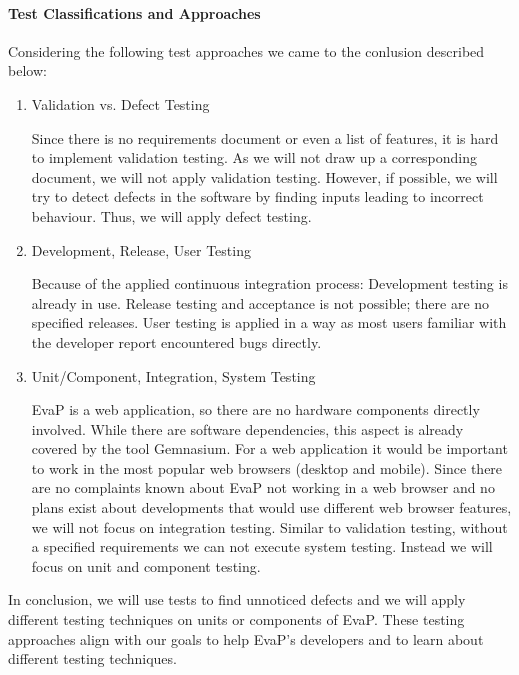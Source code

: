 \paragraph{Test Classifications and Approaches}
Considering the following test approaches we came to the conlusion described below:
\begin{enumerate}
    \item Validation vs. Defect Testing
    
    Since there is no requirements document or even a list of features, it is hard to implement validation testing. As we will not draw up a corresponding document, we will not apply validation testing. However, if possible, we will try to detect defects in the software by finding inputs leading to incorrect behaviour. Thus, we will apply defect testing.
    \item Development, Release, User Testing 
    
    Because of the applied continuous integration process: Development testing is already in use. Release testing and acceptance is not possible; there are no specified releases. User testing is applied in a way as most users familiar with the developer report encountered bugs directly.
    \item Unit/Component, Integration, System Testing
    
    EvaP is a web application, so there are no hardware components directly involved. While there are software dependencies, this aspect is already covered by the tool Gemnasium. For a web application it would be important to work in the most popular web browsers (desktop and mobile). Since there are no complaints known about EvaP not working in a web browser and no plans exist about developments that would use different web browser features, we will not focus on integration testing. Similar to validation testing, without a specified requirements we can not execute system testing. Instead we will focus on unit and component testing. 
\end{enumerate}
In conclusion, we will use tests to find unnoticed defects and we will apply different testing techniques on units or components of EvaP. These testing approaches align with our goals to help EvaP's developers and to learn about different testing techniques.

